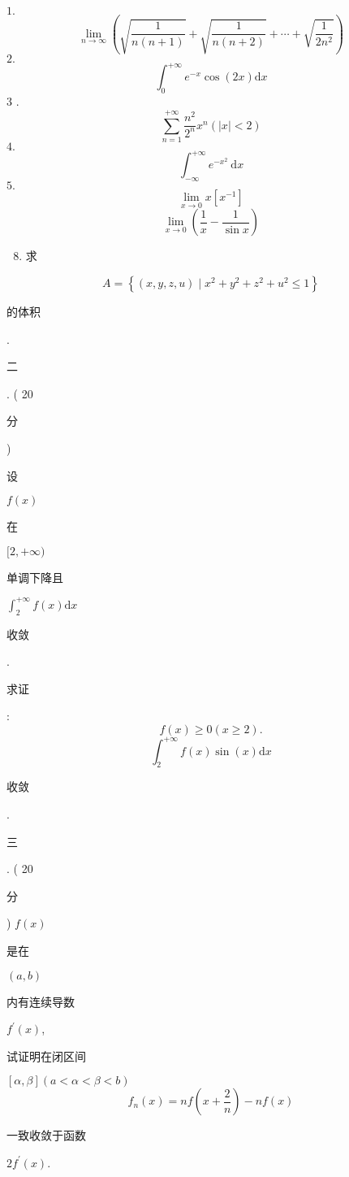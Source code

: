\documentclass[10pt]{article}
\begin{document}
$1 .$
$$
\lim _{n \rightarrow \infty}\left(\sqrt{\frac{1}{n(n+1)}}+\sqrt{\frac{1}{n(n+2)}}+\cdots+\sqrt{\frac{1}{2 n^{2}}}\right)
$$
$2 .$
$$
\int_{0}^{+\infty} e^{-x} \cos (2 x) \mathrm{d} x
$$
3 .
$$
\sum_{n=1}^{+\infty} \frac{n^{2}}{2^{n}} x^{n}(|x|<2)
$$
$4 .$
$$
\int_{-\infty}^{+\infty} e^{-x^{2}} \mathrm{~d} x
$$
$5 .$
$$
\lim _{x \rightarrow 0} x\left[x^{-1}\right]
$$
$$
\lim _{x \rightarrow 0}\left(\frac{1}{x}-\frac{1}{\sin x}\right)
$$

\begin{enumerate}
  \setcounter{enumi}{7}
  \item \begin{CJK}{UTF8}{mj}求\end{CJK}
\end{enumerate}
$$
A=\left\{(x, y, z, u) \mid x^{2}+y^{2}+z^{2}+u^{2} \leqslant 1\right\}
$$
\begin{CJK}{UTF8}{mj}的体积\end{CJK}.

\begin{CJK}{UTF8}{mj}二\end{CJK}. ( 20 \begin{CJK}{UTF8}{mj}分\end{CJK}) \begin{CJK}{UTF8}{mj}设\end{CJK} $f(x)$ \begin{CJK}{UTF8}{mj}在\end{CJK} $[2,+\infty)$ \begin{CJK}{UTF8}{mj}单调下降且\end{CJK} $\int_{2}^{+\infty} f(x) \mathrm{d} x$ \begin{CJK}{UTF8}{mj}收敛\end{CJK}. \begin{CJK}{UTF8}{mj}求证\end{CJK}:
$$
f(x) \geqslant 0(x \geqslant 2) .
$$
$$
\int_{2}^{+\infty} f(x) \sin (x) \mathrm{d} x
$$
\begin{CJK}{UTF8}{mj}收敛\end{CJK}.

\begin{CJK}{UTF8}{mj}三\end{CJK}. ( 20 \begin{CJK}{UTF8}{mj}分\end{CJK}) $f(x)$ \begin{CJK}{UTF8}{mj}是在\end{CJK} $(a, b)$ \begin{CJK}{UTF8}{mj}内有连续导数\end{CJK} $f^{\prime}(x)$, \begin{CJK}{UTF8}{mj}试证明在闭区间\end{CJK} $[\alpha, \beta](a<\alpha<\beta<b)$
$$
f_{n}(x)=n f\left(x+\frac{2}{n}\right)-n f(x)
$$
\begin{CJK}{UTF8}{mj}一致收敛于函数\end{CJK} $2 f^{\prime}(x)$.
\end{document}
